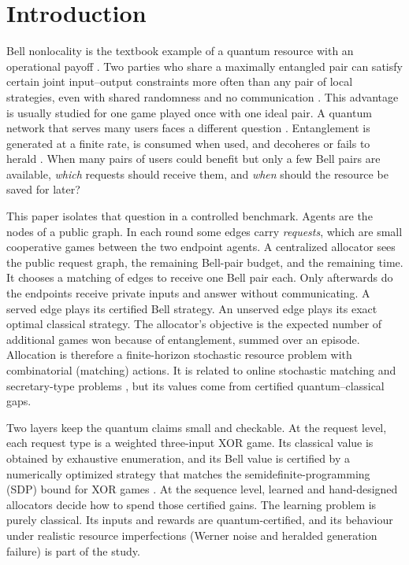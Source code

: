 \documentclass[11pt,a4paper]{article}
\begin{document}
\section{Introduction}\label{sec:intro}

Bell nonlocality is the textbook example of a quantum resource with an operational payoff \cite{bell1964einstein,clauser1969proposed,brunner2014bell}. Two parties who share a maximally entangled pair can satisfy certain joint input--output constraints more often than any pair of local strategies, even with shared randomness and no communication \cite{tsirelson1980quantum,cleve2004consequences,buhrman2010nonlocality,brassard2005quantum}. This advantage is usually studied for one game played once with one ideal pair. A quantum network that serves many users faces a different question \cite{kimble2008quantum,wehner2018quantum}. Entanglement is generated at a finite rate, is consumed when used, and decoheres or fails to herald \cite{briegel1998quantum,bernien2013heralded,hensen2015loophole}. When many pairs of users could benefit but only a few Bell pairs are available, \emph{which} requests should receive them, and \emph{when} should the resource be saved for later?

This paper isolates that question in a controlled benchmark. Agents are the nodes of a public graph. In each round some edges carry \emph{requests}, which are small cooperative games between the two endpoint agents. A centralized allocator sees the public request graph, the remaining Bell-pair budget, and the remaining time. It chooses a matching of edges to receive one Bell pair each. Only afterwards do the endpoints receive private inputs and answer without communicating. A served edge plays its certified Bell strategy. An unserved edge plays its exact optimal classical strategy. The allocator's objective is the expected number of additional games won because of entanglement, summed over an episode. Allocation is therefore a finite-horizon stochastic resource problem with combinatorial (matching) actions. It is related to online stochastic matching and secretary-type problems \cite{kleinberg2005multiple,feldman2009online}, but its values come from certified quantum--classical gaps.

Two layers keep the quantum claims small and checkable. At the request level, each request type is a weighted three-input XOR game. Its classical value is obtained by exhaustive enumeration, and its Bell value is certified by a numerically optimized strategy that matches the semidefinite-programming (SDP) bound for XOR games \cite{cleve2004consequences}. At the sequence level, learned and hand-designed allocators decide how to spend those certified gains. The learning problem is purely classical. Its inputs and rewards are quantum-certified, and its behaviour under realistic resource imperfections (Werner noise \cite{werner1989quantum} and heralded generation failure) is part of the study.
\end{document}
